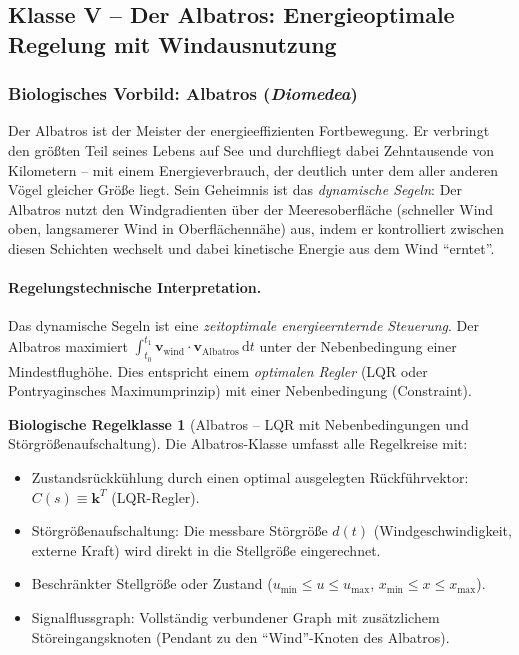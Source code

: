 \documentclass[a4paper,12pt]{article}
\theoremstyle{definition}
\newtheorem{klasse}{Biologische Regelklasse}
\begin{document}
\subsection{Klasse V -- Der Albatros: Energieoptimale Regelung mit Windausnutzung}
\label{subsec:klasse_albatros}

\subsubsection{Biologisches Vorbild: Albatros (\textit{Diomedea})}

Der Albatros ist der Meister der energieeffizienten Fortbewegung. Er verbringt
den größten Teil seines Lebens auf See und durchfliegt dabei Zehntausende von
Kilometern -- mit einem Energieverbrauch, der deutlich unter dem aller anderen
Vögel gleicher Größe liegt. Sein Geheimnis ist das \emph{dynamische
	Segeln}: Der Albatros nutzt den Windgradienten über der Meeresoberfläche
(schneller Wind oben, langsamerer Wind in Oberflächennähe) aus, indem er
kontrolliert zwischen diesen Schichten wechselt und dabei kinetische Energie
aus dem Wind ``erntet''.

\paragraph{Regelungstechnische Interpretation.}
Das dynamische Segeln ist eine \emph{zeitoptimale energieernternde Steuerung}.
Der Albatros maximiert $\int_{t_0}^{t_1} \mathbf{v}_{\text{wind}} \cdot \mathbf{v}_{\text{Albatros}}\,\mathrm{d}t$
unter der Nebenbedingung einer Mindestflughöhe. Dies entspricht einem
\emph{optimalen Regler} (LQR oder Pontryaginsches Maximumprinzip) mit einer
Nebenbedingung (Constraint).

\begin{klasse}[Albatros -- LQR mit Nebenbedingungen und Störgrößenauf\-schaltung]
	\label{kl:albatros}
	Die Albatros-Klasse umfasst alle Regelkreise mit:
	\begin{itemize}
		\item Zustandsrückkühlung durch einen optimal ausgelegten
		Rückführvektor: $C(s) \equiv \mathbf{k}^T$ (LQR-Regler).
		\item Störgrößenaufschaltung: Die messbare Störgröße $d(t)$ (Windgeschwindigkeit,
		externe Kraft) wird direkt in die Stellgröße eingerechnet.
		\item Beschränkter Stellgröße oder Zustand ($u_{\min} \leq u \leq u_{\max}$,
		$x_{\min} \leq x \leq x_{\max}$).
		\item Signalflussgraph: Vollständig verbundener Graph mit zusätzlichem
		Störeingangsknoten (Pendant zu den ``Wind''-Knoten des Albatros).
	\end{itemize}
\end{klasse}
\end{document}

